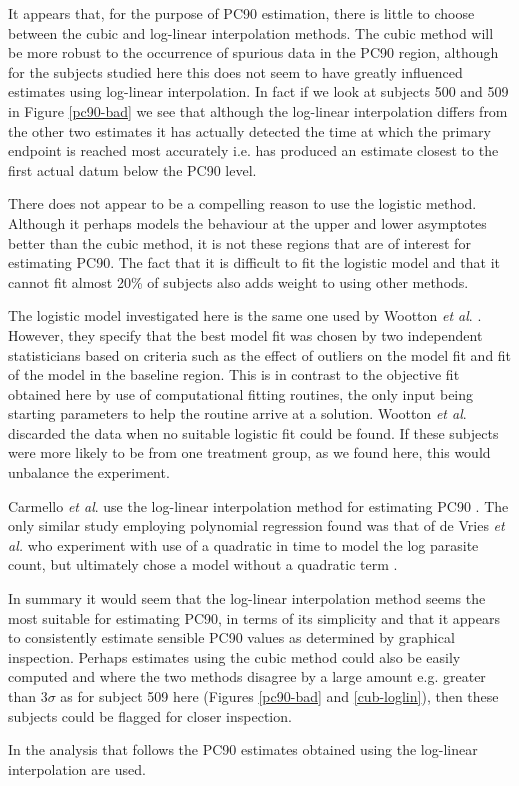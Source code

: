 It appears that, for the purpose of PC90 estimation, there is little to choose between the cubic and log-linear interpolation methods. The cubic method will be more robust to the occurrence of spurious data in the PC90 region, although for the subjects studied here this does not seem to have greatly influenced estimates using log-linear interpolation. In fact if we look at subjects 500 and 509 in Figure \ref{pc90-bad} we see that although the log-linear interpolation differs from the other two estimates it has actually detected the time at which the primary endpoint is reached most accurately i.e. has produced an estimate closest to the first actual datum below the PC90 level.

There does not appear to be a compelling reason to use the logistic method. Although it perhaps models the behaviour at the upper and lower asymptotes better than the cubic method, it is not these regions that are of interest for estimating PC90. The fact that it is difficult to fit the logistic model and that it cannot fit almost 20\% of subjects also adds weight to using other methods.

The logistic model investigated here is the same one used by Wootton \textit{et al}. \cite{wootton}. However, they specify that the best model fit was chosen by two independent statisticians based on criteria such as the effect of outliers on the model fit and fit of the model in the baseline region. This is in contrast to the objective fit obtained here by use of computational fitting routines, the only input being starting parameters to help the routine arrive at a solution. Wootton \textit{et al}. discarded the data when no suitable logistic fit could be found. If these subjects were more likely to be from one treatment group, as we found here, this would unbalance the experiment.

Carmello \textit{et al}. use the log-linear interpolation method for estimating PC90 \cite{carmello}. The only similar study employing polynomial regression found was that of de Vries \textit{et al.} who experiment with use of a quadratic in time to model the log parasite count, but ultimately chose a model without a quadratic term \cite{vries}.

In summary it would seem that the log-linear interpolation method seems the most suitable for estimating PC90, in terms of its simplicity and that it appears to consistently estimate sensible PC90 values as determined by graphical inspection. Perhaps estimates using the cubic method could also be easily computed and where the two methods disagree by a large amount e.g. greater than $3\sigma$ as for subject 509 here (Figures \ref{pc90-bad} and \ref{cub-loglin}), then these subjects could be flagged for closer inspection.

In the analysis that follows the PC90 estimates obtained using the log-linear interpolation are used.
